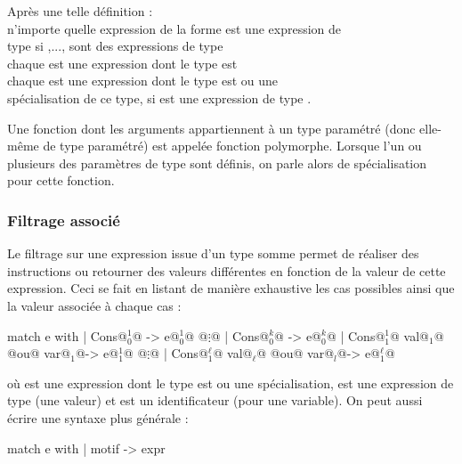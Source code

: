 		Après une telle définition : \\
			 \bdot n'importe quelle expression de la forme  est une expression de \\ \listskip type si ,..., sont des expressions de type \\
			 \bdot chaque  est une expression dont le type est  \\
			 \bdot chaque  est une expression dont le type est  ou une \\ \listskip spécialisation de ce type, si  est une expression de type .
	
		\begin{Remarque}
			Une fonction dont les arguments appartiennent à un type paramétré (donc elle-même de type paramétré) est appelée fonction polymorphe. Lorsque l'un ou plusieurs des paramètres de type sont définis, on parle alors de spécialisation pour cette fonction.
		\end{Remarque}
	
		\subsubsection{Filtrage associé}
		
			\begin{Syntaxe}[filtrage]
				Le filtrage sur une expression issue d'un type somme permet de réaliser des instructions ou retourner des valeurs différentes en fonction de la valeur de cette expression. Ceci se fait en listant de manière exhaustive les cas possibles ainsi que la valeur associée à chaque cas : 
				\begin{Caml}
						match e with
							| Cons@$^1_0$@ -> e@$^1_0$@
							    @$\vdots$@
							| Cons@$^k_0$@ -> e@$^k_0$@
							| Cons@$^1_1$@ val@$_{1}$@ @$\text{ou}$@ var@$_{1} $@-> e@$^1_1$@
								@$\vdots$@
							| Cons@$^\ell_1$@ val@$_{\ell}$@ @$\text{ou}$@ var@$_{l} $@-> e@$^\ell_1$@
				\end{Caml}
				où  est une expression dont le type est  ou une spécialisation,  est une expression de type  (une valeur) et  est un identificateur (pour une variable). \nt
				On peut aussi écrire une syntaxe plus générale : 
				\begin{Caml}
							  match e with
							      | motif -> expr
				\end{Caml}
			\end{Syntaxe}
			
